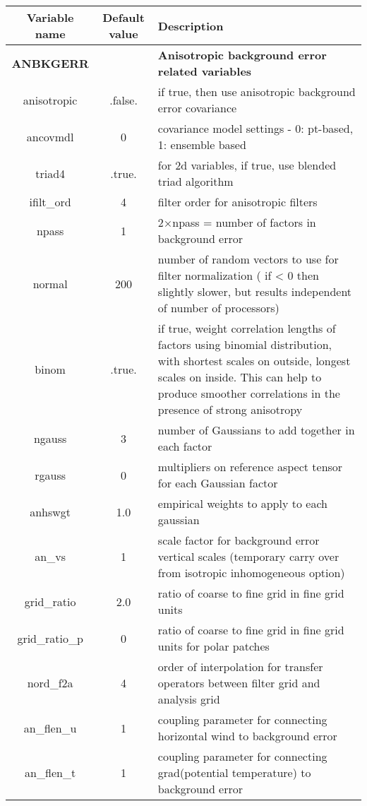 \begin{table}[h]
 \footnotesize
 \center
 \begin{tabular}{| c | c | p{9cm} |}
 \hline
 Variable name & Default value & Description \\
 \hline
\textbf{ANBKGERR} &   & \textbf{Anisotropic background error related variables} \\
 \hline 
 anisotropic & .false. & if true, then use anisotropic background error covariance \\
 \hline
 ancovmdl & 0 & covariance model settings - 0: pt-based, 1: ensemble based \\
 \hline
 triad4	& .true. & for 2d variables, if true, use blended triad algorithm \\
 \hline
 ifilt\_ord & 4	& filter order for anisotropic filters \\
 \hline
 npass & 1 & 2×npass = number of factors in background error \\
 \hline
 normal & 200 & number of random vectors to use for filter normalization ( if < 0 then slightly slower, but results independent of number of processors) \\
 \hline
 binom & .true.	& if true, weight correlation lengths of factors using binomial distribution, with shortest scales on outside, longest scales on inside.  This can help to produce smoother correlations in the presence of strong anisotropy \\
 \hline
 ngauss	& 3	& number of Gaussians to add together in each factor \\
 \hline
 rgauss	& 0	& multipliers on reference aspect tensor for each Gaussian factor \\
 \hline
 anhswgt & 1.0 & empirical weights to apply to each gaussian \\
 \hline
 an\_vs	& 1	& scale factor for background error vertical scales (temporary carry over from isotropic inhomogeneous option) \\
 \hline
 grid\_ratio & 2.0 & ratio of coarse to fine grid in fine grid units \\
 \hline
 grid\_ratio\_p	& 0	& ratio of coarse to fine grid in fine grid units for polar patches \\
 \hline
 nord\_f2a & 4 & order of interpolation for transfer operators between filter grid and analysis grid \\
 \hline
 an\_flen\_u & 1 & coupling parameter for connecting horizontal wind to background error \\
 \hline
 an\_flen\_t & 1 & coupling parameter for connecting grad(potential temperature) to background error \\

\end{tabular}
\end{table}

